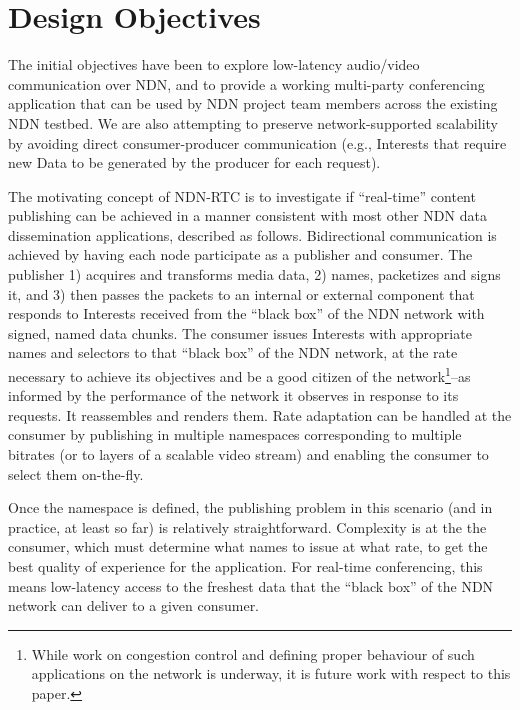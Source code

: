 \documentclass{icn/sig-alternate-2013} %
\newcommand{\ndnrtcName}{NDN-RTC} %
\begin{document}
\section{Design Objectives}
\label{sec:goals}
 The initial objectives have been to explore low-latency audio/video communication over NDN, and to provide a working multi-party conferencing application that can be used by NDN project team members across the existing NDN testbed.  We are also attempting to preserve network-supported scalability by avoiding direct consumer-producer communication (e.g., Interests that require new Data to be generated by the producer for each request).  


The motivating concept of \ndnrtcName{} is to investigate if ``real-time'' content publishing can be achieved in a manner consistent with most other NDN data dissemination applications, described as follows. Bidirectional communication is achieved by having each node participate as a publisher and consumer. The publisher 1) acquires and transforms media data, 2) names, packetizes and signs it, and 3) then passes the packets to an internal or external component that responds to Interests received from the ``black box'' of the NDN network with signed, named data chunks. The consumer issues Interests with appropriate names and selectors to that ``black box'' of the NDN network, at the rate necessary to achieve its objectives and be a good citizen of the network\footnote{While work on congestion control and defining proper behaviour of such applications on the network is underway, it is future work with respect to this paper.}--as informed by the performance of the network it observes in response to its requests. It reassembles and renders them.  Rate adaptation can be handled at the consumer by publishing in multiple namespaces corresponding to multiple bitrates (or to layers of a scalable video stream) and enabling the consumer to select them on-the-fly.

Once the namespace is defined, the publishing problem in this scenario (and in practice, at least so far) is relatively straightforward.  Complexity is at the the consumer, which must determine what names to issue at what rate, to get the best quality of experience for the application.  For real-time conferencing, this means low-latency access to the freshest data that the ``black box'' of the NDN network can deliver to a given consumer.  
\end{document}
